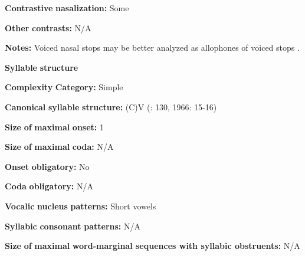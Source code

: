 \documentclass[output=paper]{langsci/langscibook}
\begin{document}
\begin{styleBody}
\textbf{Contrastive} \textbf{nasalization:} Some
\end{styleBody}

\begin{styleBody}
\textbf{Other} \textbf{contrasts:} N/A
\end{styleBody}

\begin{styleBody}
\textbf{Notes:} Voiced nasal stops may be better analyzed as allophones of voiced stops \citep[176]{Newman1986}.
\end{styleBody}

\begin{styleBody}
\textbf{Syllable} \textbf{structure}
\end{styleBody}

\begin{styleBody}
\textbf{Complexity} \textbf{Category:} Simple
\end{styleBody}

\begin{styleBody}
\textbf{Canonical} \textbf{syllable} \textbf{structure:} (C)V (\citealt{Innes1981}: 130, 1966: 15-16)
\end{styleBody}

\begin{styleBody}
\textbf{Size} \textbf{of} \textbf{maximal} \textbf{onset:} 1
\end{styleBody}

\begin{styleBody}
\textbf{Size} \textbf{of} \textbf{maximal} \textbf{coda:} N/A
\end{styleBody}

\begin{styleBody}
\textbf{Onset} \textbf{obligatory:} No
\end{styleBody}

\begin{styleBody}
\textbf{Coda} \textbf{obligatory:} N/A
\end{styleBody}

\begin{styleBody}
\textbf{Vocalic} \textbf{nucleus} \textbf{patterns:} Short vowels
\end{styleBody}

\begin{styleBody}
\textbf{Syllabic} \textbf{consonant} \textbf{patterns:} N/A
\end{styleBody}

\begin{styleBody}
\textbf{Size} \textbf{of} \textbf{maximal} \textbf{word{}-marginal sequences with syllabic obstruents:} N/A
\end{styleBody}
\end{document}
